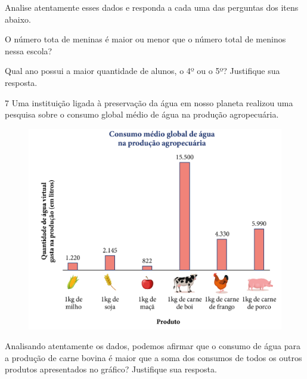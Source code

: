 Analise atentamente esses dados e responda a cada uma das perguntas dos
itens abaixo.

\begin{escolha}
\item
  O número tota de meninas é maior ou menor que o número total de
  meninos nessa escola?


\item
  Qual ano possui a maior quantidade de alunos, o 4º ou o 5º? Justifique
  sua resposta.

\end{escolha}

\pagebreak

\num{7} Uma instituição ligada à preservação da água em nosso planeta
realizou uma pesquisa sobre o consumo global médio de água na produção
agropecuária.

\begin{figure}[htpb!]
\includegraphics[width=\textwidth]{../ilustracoes/MAT5/SAEB_5ANO_MAT_figura106.png}
\end{figure}

Analisando atentamente os dados, podemos afirmar que o consumo de água
para a produção de carne bovina é maior que a soma dos consumos de todos
os outros produtos apresentados no gráfico? Justifique sua resposta.

